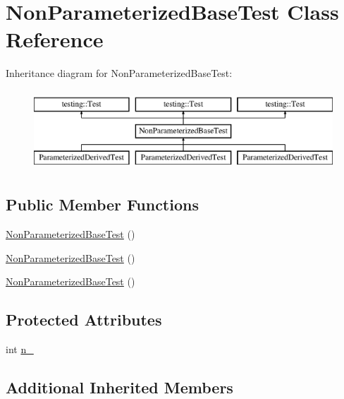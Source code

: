 \hypertarget{class_non_parameterized_base_test}{}\section{Non\+Parameterized\+Base\+Test Class Reference}
\label{class_non_parameterized_base_test}
Inheritance diagram for Non\+Parameterized\+Base\+Test\+:\begin{figure}[H]
\begin{center}
\leavevmode
\includegraphics[height=3.000000cm]{d9/dc7/class_non_parameterized_base_test}
\end{center}
\end{figure}
\subsection*{Public Member Functions}
\begin{DoxyCompactItemize}
\item 
\mbox{\hyperlink{class_non_parameterized_base_test_aeef052bc258fa8bbe44d550a82d28fe6}{Non\+Parameterized\+Base\+Test}} ()
\item 
\mbox{\hyperlink{class_non_parameterized_base_test_aeef052bc258fa8bbe44d550a82d28fe6}{Non\+Parameterized\+Base\+Test}} ()
\item 
\mbox{\hyperlink{class_non_parameterized_base_test_aeef052bc258fa8bbe44d550a82d28fe6}{Non\+Parameterized\+Base\+Test}} ()
\end{DoxyCompactItemize}
\subsection*{Protected Attributes}
\begin{DoxyCompactItemize}
\item 
int \mbox{\hyperlink{class_non_parameterized_base_test_a617d4bbfd2aa5f6d41eea3089f7ad039}{n\+\_\+}}
\end{DoxyCompactItemize}
\subsection*{Additional Inherited Members}


